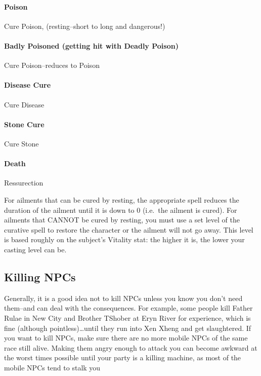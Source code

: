 \documentclass[12pt]{article}
\let\oldparagraph\paragraph
\renewcommand{\paragraph}[1]{\oldparagraph{#1}\mbox{}}
\begin{document}
\paragraph{Poison} Cure Poison, (resting--short to long and dangerous!)

\paragraph{Badly Poisoned (getting hit with Deadly Poison)} Cure
Poison--reduces to Poison

\paragraph{Disease Cure} Cure Disease

\paragraph{Stone Cure} Cure Stone

\paragraph{Death\protect\footnotemark{}} Ressurection

For ailments that can be cured by resting, the appropriate spell reduces the
duration of the ailment until it is down to 0 (i.e.~the ailment is
cured). For ailments that CANNOT be cured by resting, you must use a set
level of the curative spell to restore the character or the ailment will not
go away. This level is based roughly on the subject's Vitality stat: the
higher it is, the lower your casting level can be.

\subsection{Killing NPCs}\label{killing-npcs}

Generally, it is a good idea not to kill NPCs unless you know you don't
need them--and can deal with the consequences. For example, some people
kill Father Rulae in New City and Brother TShober at Eryn River for
experience, which is fine (although pointless)\ldots{}until they run
into Xen Xheng and get slaughtered. If you want to kill NPCs, make sure
there are no more mobile NPCs of the same race still alive. Making them
angry enough to attack you can become awkward at the worst times
possible until your party is a killing machine, as most of the mobile
NPCs tend to stalk you
\end{document}
